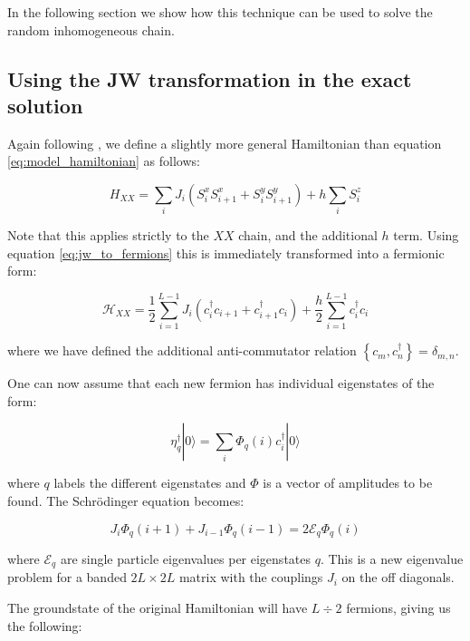 In the following section we show how this technique can be used to solve the random inhomogeneous chain.

\subsection{Using the JW transformation in the exact solution}\label{subsec:exact_sol_jw}

Again following \cite{paola2016}, we define a slightly more general Hamiltonian than equation \ref{eq:model_hamiltonian} as follows: 

\begin{equation}
H_{X X} =\sum_{i} J_i\left(S_i^x S_{i+1}^x+S_i^y S_{i+1}^y\right)+h \sum_{i} S_i^z
\end{equation}

Note that this applies strictly to the $XX$ chain, and the additional $h$ term. Using equation \ref{eq:jw_to_fermions} this is immediately transformed into a fermionic form: 

\begin{equation}
\mathcal{H}_{X X}=\frac{1}{2} \sum_{i=1}^{L-1} J_i\left(c_i^{\dagger} c_{i+1}+c_{i+1}^{\dagger} c_i\right)+\frac{h}{2} \sum_{i=1}^{L-1} c_i^{\dagger} c_i
\end{equation}

where we have defined the additional anti-commutator relation $\left\{c_m, c_n^{\dagger}\right\}=\delta_{m, n}$. 

One can now assume that each new fermion has individual eigenstates of the form:

\begin{equation}\label{eq:eta_operator_def}
\eta_q^{\dagger}|0\rangle = \sum_i \Phi_q(i) c_i^{\dagger}|0\rangle
\end{equation}

where $q$ labels the different eigenstates and $\Phi$ is a vector of amplitudes to be found. The Schrödinger equation becomes: 

\begin{equation}
J_i \Phi_q(i+1)+J_{i-1} \Phi_q(i-1)=2 \mathcal{E}_q \Phi_q(i)
\end{equation}

where $\mathcal{E}_q$ are single particle eigenvalues per eigenstates $q$. This is a new eigenvalue problem for a banded $2L \times 2L$ matrix with the couplings $J_i$ on the off diagonals. 

The groundstate of the original Hamiltonian will have $L \div 2$ fermions, giving us the following: 

